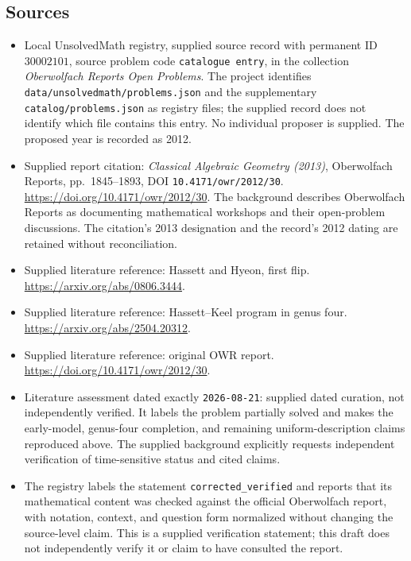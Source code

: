 \documentclass[11pt]{article}
\begin{document}
\subsection{Sources}
\begin{itemize}
\item Local UnsolvedMath registry, supplied source record with permanent ID \(30002101\), source problem code \texttt{catalogue entry}, in the collection \emph{Oberwolfach Reports Open Problems}. The project identifies \texttt{data/unsolvedmath/problems.json} and the supplementary \texttt{catalog/problems.json} as registry files; the supplied record does not identify which file contains this entry. No individual proposer is supplied. The proposed year is recorded as 2012.
\item Supplied report citation: \emph{Classical Algebraic Geometry (2013)}, Oberwolfach Reports, pp.\ 1845--1893, DOI \texttt{10.4171/owr/2012/30}. \url{https://doi.org/10.4171/owr/2012/30}. The background describes Oberwolfach Reports as documenting mathematical workshops and their open-problem discussions. The citation's 2013 designation and the record's 2012 dating are retained without reconciliation.
\item Supplied literature reference: Hassett and Hyeon, first flip. \url{https://arxiv.org/abs/0806.3444}.
\item Supplied literature reference: Hassett--Keel program in genus four. \url{https://arxiv.org/abs/2504.20312}.
\item Supplied literature reference: original OWR report. \url{https://doi.org/10.4171/owr/2012/30}.
\item Literature assessment dated exactly \texttt{2026-08-21}: supplied dated curation, not independently verified. It labels the problem partially solved and makes the early-model, genus-four completion, and remaining uniform-description claims reproduced above. The supplied background explicitly requests independent verification of time-sensitive status and cited claims.
\item The registry labels the statement \texttt{corrected\_verified} and reports that its mathematical content was checked against the official Oberwolfach report, with notation, context, and question form normalized without changing the source-level claim. This is a supplied verification statement; this draft does not independently verify it or claim to have consulted the report.
\end{itemize}
\end{document}
